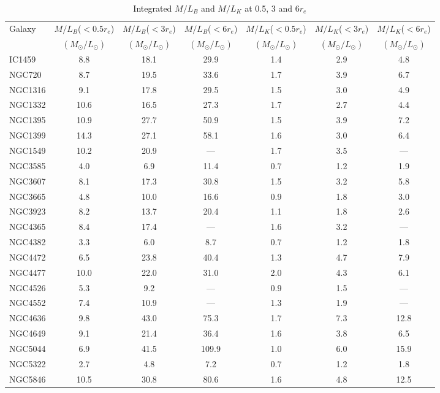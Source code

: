 \documentclass[structabstract]{aa}
\begin{document}
\begin{table}
\caption{Integrated $M/L_B$ and $M/L_K$ at 0.5, 3 and 6$r_e$}
\label{tab:ml}
\centering
\begin{tabular}{lcccccc}
\hline \hline
Galaxy & $M/L_B$($<0.5r_e$) & $M/L_B$($<3r_e$) & $M/L_B$($<6r_e$) & $M/L_K$($<0.5r_e$) & $M/L_K$($<3r_e$) & $M/L_K$($<6r_e$) \\
       & $(M_{\odot}/L_{\odot})$ & $(M_{\odot}/L_{\odot})$ & $(M_{\odot}/L_{\odot})$ & $(M_{\odot}/L_{\odot})$ &$(M_{\odot}/L_{\odot})$ & $(M_{\odot}/L_{\odot})$\\\hline
IC1459 &   8.8 &  18.1 &  29.9 &   1.4 &   2.9 &   4.8 \\
NGC720 &   8.7 &  19.5 &  33.6 &   1.7 &   3.9 &   6.7 \\
NGC1316 &   9.1 &  17.8 &  29.5 &   1.5 &   3.0 &   4.9 \\
NGC1332 &  10.6 &  16.5 &  27.3 &   1.7 &   2.7 &   4.4 \\
NGC1395 &  10.9 &  27.7 &  50.9 &   1.5 &   3.9 &   7.2 \\
NGC1399 &  14.3 &  27.1 &  58.1 &   1.6 &   3.0 &   6.4 \\
NGC1549 &  10.2 &  20.9 &   --- &   1.7 &   3.5 &   --- \\
NGC3585 &   4.0 &   6.9 &  11.4 &   0.7 &   1.2 &   1.9 \\
NGC3607 &   8.1 &  17.3 &  30.8 &   1.5 &   3.2 &   5.8 \\
NGC3665 &   4.8 &  10.0 &  16.6 &   0.9 &   1.8 &   3.0 \\
NGC3923 &   8.2 &  13.7 &  20.4 &   1.1 &   1.8 &   2.6 \\
NGC4365 &   8.4 &  17.4 &   --- &   1.6 &   3.2 &   --- \\
NGC4382 &   3.3 &   6.0 &   8.7 &   0.7 &   1.2 &   1.8 \\
NGC4472 &   6.5 &  23.8 &  40.4 &   1.3 &   4.7 &   7.9 \\
NGC4477 &  10.0 &  22.0 &  31.0 &   2.0 &   4.3 &   6.1 \\
NGC4526 &   5.3 &   9.2 &   --- &   0.9 &   1.5 &   --- \\
NGC4552 &   7.4 &  10.9 &   --- &   1.3 &   1.9 &   --- \\
NGC4636 &   9.8 &  43.0 &  75.3 &   1.7 &   7.3 &  12.8 \\
NGC4649 &   9.1 &  21.4 &  36.4 &   1.6 &   3.8 &   6.5 \\
NGC5044 &   6.9 &  41.5 & 109.9 &   1.0 &   6.0 &  15.9 \\
NGC5322 &   2.7 &   4.8 &   7.2 &   0.7 &   1.2 &   1.8 \\
NGC5846 &  10.5 &  30.8 &  80.6 &   1.6 &   4.8 &  12.5 \\
\hline
\end{tabular}
\end{table}
\end{document}
